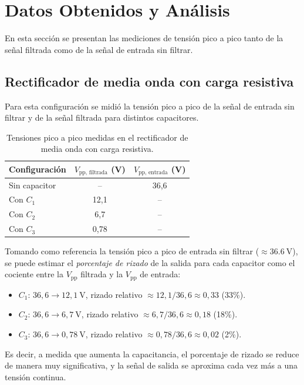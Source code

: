 \documentclass[a4paper,12pt]{article}
\begin{document}
\section{Datos Obtenidos y Análisis}

En esta sección se presentan las mediciones de tensión pico a pico tanto de la señal filtrada como de la señal de entrada sin filtrar.

\subsection{Rectificador de media onda con carga resistiva}

Para esta configuración se midió la tensión pico a pico de la señal de entrada sin filtrar y de la señal filtrada para distintos capacitores.

\begin{table}[H]
    \centering
    \begin{tabular}{lcc}
        \toprule
        Configuración & $V_{\text{pp, filtrada}}$ (\si{\volt}) & $V_{\text{pp, entrada}}$ (\si{\volt}) \\
        \midrule
        Sin capacitor & --   & 36,6 \\
        Con $C_1$     & 12,1 & --   \\
        Con $C_2$     & 6,7  & --   \\
        Con $C_3$     & 0,78 & --   \\
        \bottomrule
    \end{tabular}
    \caption{Tensiones pico a pico medidas en el rectificador de media onda con carga resistiva.}
\end{table}

Tomando como referencia la tensión pico a pico de entrada sin filtrar (\(\approx \SI{36,6}{\volt}\)), se puede estimar el \emph{porcentaje de rizado} de la salida para cada capacitor como el cociente entre la \(V_{\text{pp}}\) filtrada y la \(V_{\text{pp}}\) de entrada:
\begin{itemize}
    \item \(C_1\): \(36{,}6 \rightarrow 12{,}1\ \text{V}\), rizado relativo \(\approx 12{,}1/36{,}6 \approx 0{,}33\) (33\%).
    \item \(C_2\): \(36{,}6 \rightarrow 6{,}7\ \text{V}\), rizado relativo \(\approx 6{,}7/36{,}6 \approx 0{,}18\) (18\%).
    \item \(C_3\): \(36{,}6 \rightarrow 0{,}78\ \text{V}\), rizado relativo \(\approx 0{,}78/36{,}6 \approx 0{,}02\) (2\%).
\end{itemize}
Es decir, a medida que aumenta la capacitancia, el porcentaje de rizado se reduce de manera muy significativa, y la señal de salida se aproxima cada vez más a una tensión continua.
\end{document}
